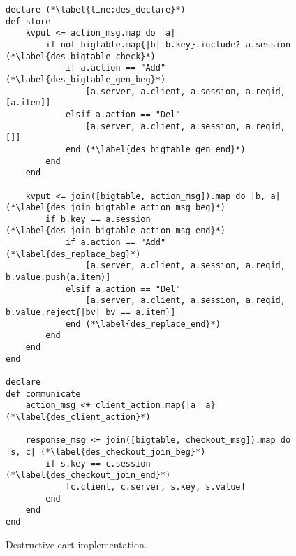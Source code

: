 \begin{comment}
\jmh{Alternative to lines 5--9 is to insert the following rule.  It ``preserves'' the action items that have adds but no deletes ... i.e. the other branch of the left-outer-join.  I think this is easier to explain.}  \jmh{regardless of what you decide, be sure to explain all lines of the program!}
\begin{scriptsize}
\begin{verbatim}
	status <= join(action_cnt, checkout).map do |a, c|
	  if a.action == "Add" and not
	        action_cnt.map{|d| d.id if d.action == "Del" and a.id}.include? a.id
	     [a.session, a.item, a.cnt]
	  end
	end
\end{verbatim}	
\end{scriptsize}
\end{comment}

\begin{figure}[t]
\begin{scriptsize}
\begin{lstlisting}
declare (*\label{line:des_declare}*)
def store
	kvput <= action_msg.map do |a|
		if not bigtable.map{|b| b.key}.include? a.session (*\label{des_bigtable_check}*)
			if a.action == "Add" (*\label{des_bigtable_gen_beg}*)
				[a.server, a.client, a.session, a.reqid, [a.item]]
			elsif a.action == "Del"
				[a.server, a.client, a.session, a.reqid, []]
			end (*\label{des_bigtable_gen_end}*)
		end
	end  

	kvput <= join([bigtable, action_msg]).map do |b, a| (*\label{des_join_bigtable_action_msg_beg}*)
		if b.key == a.session (*\label{des_join_bigtable_action_msg_end}*)
			if a.action == "Add" (*\label{des_replace_beg}*)
				[a.server, a.client, a.session, a.reqid, b.value.push(a.item)]
			elsif a.action == "Del"
				[a.server, a.client, a.session, a.reqid, b.value.reject{|bv| bv == a.item}]
			end (*\label{des_replace_end}*)
		end
	end
end

declare
def communicate
	action_msg <+ client_action.map{|a| a} (*\label{des_client_action}*)

	response_msg <+ join([bigtable, checkout_msg]).map do |s, c| (*\label{des_checkout_join_beg}*)
		if s.key == c.session (*\label{des_checkout_join_end}*)
			[c.client, c.server, s.key, s.value]
		end
	end
end
\end{lstlisting}
\vspace{-10pt}
\caption{Destructive cart implementation.}
\label{fig:pdg-destructive}
\vspace{-2pt}
\end{scriptsize}
\end{figure}
